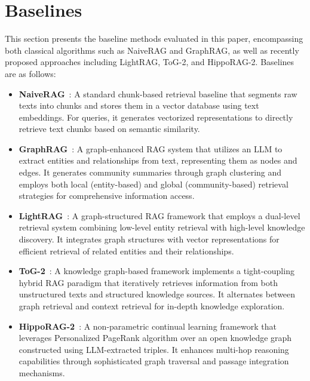\section{Baselines}
\label{appendix:baselines}
This section presents the baseline methods evaluated in this paper, encompassing both classical algorithms such as NaiveRAG and GraphRAG, as well as recently proposed approaches including LightRAG, ToG-2, and HippoRAG-2.
Baselines are as follows:
\begin{itemize}
    \item \textbf{NaiveRAG}~\citep{gao2023rag_survey}: A standard chunk-based retrieval baseline that segments raw texts into chunks and stores them in a vector database using text embeddings. For queries, it generates vectorized representations to directly retrieve text chunks based on semantic similarity.

    \item \textbf{GraphRAG}~\citep{edge2024local}: A graph-enhanced RAG system that utilizes an LLM to extract entities and relationships from text, representing them as nodes and edges. It generates community summaries through graph clustering and employs both local (entity-based) and global (community-based) retrieval strategies for comprehensive information access.

    \item \textbf{LightRAG}~\citep{guo2024lightrag}: A graph-structured RAG framework that employs a dual-level retrieval system combining low-level entity retrieval with high-level knowledge discovery. It integrates graph structures with vector representations for efficient retrieval of related entities and their relationships.

    \item \textbf{ToG-2}~\citep{ma2024tog2}: A knowledge graph-based framework implements a tight-coupling hybrid RAG paradigm that iteratively retrieves information from both unstructured texts and structured knowledge sources. It alternates between graph retrieval and context retrieval for in-depth knowledge exploration.

    \item \textbf{HippoRAG-2}~\citep{gutiérrez2025HippoRAG2}: A non-parametric continual learning framework that leverages Personalized PageRank algorithm over an open knowledge graph constructed using LLM-extracted triples. It enhances multi-hop reasoning capabilities through sophisticated graph traversal and passage integration mechanisms.
\end{itemize}